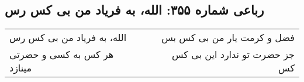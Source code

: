 \begin{center}
\section*{رباعی شماره ۳۵۵: الله، به فریاد من بی کس رس}
\label{sec:sh355}
\begin{longtable}{l p{0.5cm} r}
الله، به فریاد من بی کس رس
&&
فضل و کرمت یار من بی کس بس
\\
هر کس به کسی و حضرتی مینازد
&&
جز حضرت تو ندارد این بی کس کس
\\
\end{longtable}
\end{center}
